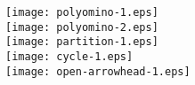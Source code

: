 \documentclass{article}
\begin{document}
\texttt{[image: polyomino-1.eps]}
\\[2in]
\texttt{[image: polyomino-2.eps]}
\\[2in]
\texttt{[image: partition-1.eps]}
\\[2in]
\texttt{[image: cycle-1.eps]}
\\[2in]
\texttt{[image: open-arrowhead-1.eps]}
\end{document}
